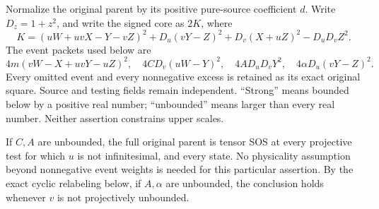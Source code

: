 \label{p89fd3edb3edd:sec:r6-c1-common-remote}
Normalize the original parent by its positive pure-source coefficient $d$.
Write $D_z=1+z^2$, and write the signed core as $2K$, where
\[
 K=(uW+uvX-Y-vZ)^2+D_u(vY-Z)^2+D_v(X+uZ)^2-D_uD_vZ^2.
 \tag{CE1}
\]
The event packets used below are
\[
4m(vW-X+uvY-uZ)^2,\quad4CD_v(uW-Y)^2,
\quad4AD_uD_vY^2,\quad4\alpha D_u(vY-Z)^2.
\]
Every omitted event and every nonnegative excess is retained as its exact
original square. Source and testing fields remain independent. ``Strong''
means bounded below by a positive real number; ``unbounded'' means larger
than every real number. Neither assertion constrains upper scales.

\begin{theorem}
If $C,A$ are unbounded, the full original parent is tensor SOS at every
projective test for which $u$ is not infinitesimal, and every state.
No physicality assumption beyond nonnegative event weights is needed for
this particular assertion. By the exact cyclic relabeling below, if
$A,\alpha$ are unbounded, the conclusion holds whenever $v$ is not
projectively unbounded.
\end{theorem}
